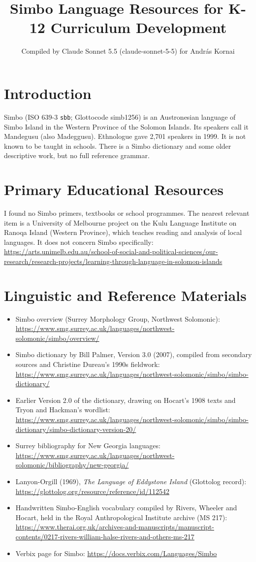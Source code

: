 \documentclass[12pt]{article}
\title{Simbo Language Resources for K-12 Curriculum Development}
\author{Compiled by Claude Sonnet 5.5 (claude-sonnet-5-5) for Andr\'as Kornai}
\date{}
\begin{document}
\maketitle

\section{Introduction}
Simbo (ISO 639-3 \texttt{sbb}; Glottocode simb1256) is an Austronesian language of Simbo Island in the Western Province of the Solomon Islands. Its speakers call it Mandegusu (also Madeggusu). Ethnologue gave 2,701 speakers in 1999. It is not known to be taught in schools. There is a Simbo dictionary and some older descriptive work, but no full reference grammar.

\section{Primary Educational Resources}
I found no Simbo primers, textbooks or school programmes. The nearest relevant item is a University of Melbourne project on the Kulu Language Institute on Ranoqa Island (Western Province), which teaches reading and analysis of local languages. It does not concern Simbo specifically: \url{https://arts.unimelb.edu.au/school-of-social-and-political-sciences/our-research/research-projects/learning-through-language-in-solomon-islands}

\section{Linguistic and Reference Materials}
\begin{itemize}
\item Simbo overview (Surrey Morphology Group, Northwest Solomonic): \url{https://www.smg.surrey.ac.uk/languages/northwest-solomonic/simbo/overview/}
\item Simbo dictionary by Bill Palmer, Version 3.0 (2007), compiled from secondary sources and Christine Dureau's 1990s fieldwork: \url{https://www.smg.surrey.ac.uk/languages/northwest-solomonic/simbo/simbo-dictionary/}
\item Earlier Version 2.0 of the dictionary, drawing on Hocart's 1908 texts and Tryon and Hackman's wordlist: \url{https://www.smg.surrey.ac.uk/languages/northwest-solomonic/simbo/simbo-dictionary/simbo-dictionary-version-20/}
\item Surrey bibliography for New Georgia languages: \url{https://www.smg.surrey.ac.uk/languages/northwest-solomonic/bibliography/new-georgia/}
\item Lanyon-Orgill (1969), \emph{The Language of Eddystone Island} (Glottolog record): \url{https://glottolog.org/resource/reference/id/112542}
\item Handwritten Simbo-English vocabulary compiled by Rivers, Wheeler and Hocart, held in the Royal Anthropological Institute archive (MS 217): \url{https://www.therai.org.uk/archives-and-manuscripts/manuscript-contents/0217-rivers-william-halse-rivers-and-others-ms-217}
\item Verbix page for Simbo: \url{https://docs.verbix.com/Languages/Simbo}
\end{itemize}
\end{document}
